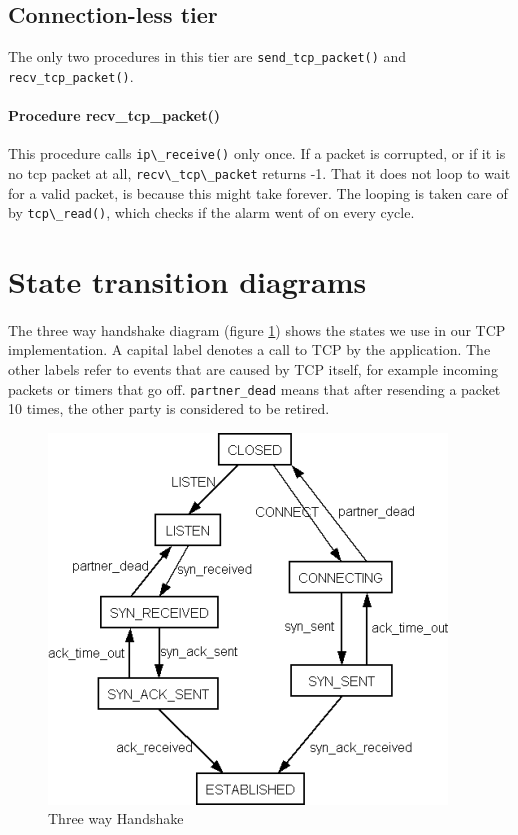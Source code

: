 \documentclass[11pt]{article}
\begin{document}
\subsection{Connection-less tier}

The only two procedures in this tier are \lstinline|send_tcp_packet()| and
\lstinline|recv_tcp_packet()|.

\paragraph{Procedure recv\_tcp\_packet()}
This procedure calls \lstinline|ip\_receive()| only once. If a packet is corrupted,
or if it is no tcp packet at all, \lstinline|recv\_tcp\_packet| returns -1.
That it does not loop to wait for a valid packet, is because this might take 
forever. The looping is taken care of by \lstinline|tcp\_read()|, which checks if the alarm 
went of on every cycle.

\appendix

\section{State transition diagrams}\label{sec:A}

\paragraph{}
The three way handshake diagram (figure \ref{figuur:handshake}) shows the
states we use in our TCP implementation. A capital label denotes a call to
TCP by the application. The other labels refer to events that are caused by
TCP itself, for example incoming packets or timers that go
off. \lstinline|partner_dead| means that after resending a packet 10 times,
the other party is considered to be retired.


\begin{figure}
\begin{center}
\includegraphics{handshake.png}
\end{center}
\caption{Three way Handshake}
\label{figuur:handshake}
\end{figure}
\end{document}
